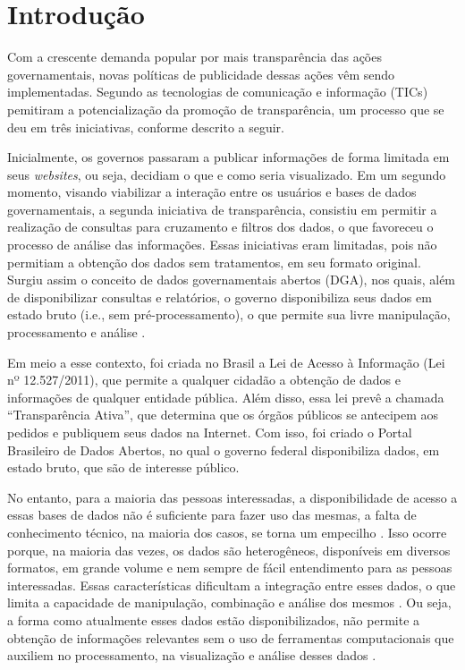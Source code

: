 
\chapter{Introdução}
\label{chap:introducao}

Com a crescente demanda popular por mais transparência das ações governamentais, novas
políticas de publicidade dessas ações vêm sendo implementadas. Segundo 
as tecnologias de comunicação e informação (TICs) pemitiram a potencialização da promoção
de transparência, um processo que se deu em três iniciativas, conforme descrito a seguir.

Inicialmente, os governos passaram a publicar informações de forma limitada em seus 
\textit{websites}, ou seja, decidiam o que e como seria visualizado. Em um segundo momento, 
visando viabilizar a interação entre os usuários e bases de dados governamentais, a segunda 
iniciativa de transparência, consistiu em permitir a realização de consultas para cruzamento 
e filtros dos dados, o que favoreceu o processo de análise das informações. Essas iniciativas 
eram limitadas, pois não permitiam a obtenção dos dados sem tratamentos, em seu formato original. 
Surgiu assim o conceito de dados governamentais abertos (DGA), nos quais, além de 
disponibilizar consultas e relatórios, o governo disponibiliza seus dados em estado bruto
(i.e., sem pré-processamento), o que permite sua livre manipulação, processamento e 
análise \cite{vaz2010dados}.

Em meio a esse contexto, foi criada no Brasil a Lei de Acesso à Informação 
(Lei nº 12.527/2011), que permite a qualquer cidadão a obtenção de dados e informações 
de qualquer entidade pública. Além disso, essa lei prevê a chamada “Transparência Ativa”, 
que determina que os órgãos públicos se antecipem aos pedidos e publiquem seus dados na 
Internet. Com isso, foi criado o Portal Brasileiro de Dados Abertos, no qual o 
governo federal disponibiliza dados, em estado bruto, que são de interesse público. 

No entanto, para a maioria das pessoas interessadas, a disponibilidade de acesso a essas 
bases de dados não é suficiente para fazer uso das mesmas, a falta de conhecimento técnico, 
na maioria dos casos, se torna um empecilho \cite{graves2013}. Isso ocorre porque, na 
maioria das vezes, os dados são heterogêneos, disponíveis em diversos formatos, em grande 
volume e nem sempre de fácil entendimento para as pessoas interessadas. Essas características 
dificultam a integração entre esses dados, o que limita a capacidade de manipulação, 
combinação e análise dos mesmos \cite{hoxha2011open}. Ou seja, a forma como atualmente esses 
dados estão disponibilizados, não permite a obtenção de informações relevantes sem o uso de 
ferramentas computacionais que auxiliem no processamento, na visualização e análise desses 
dados \cite{vaz2010dados}. 

